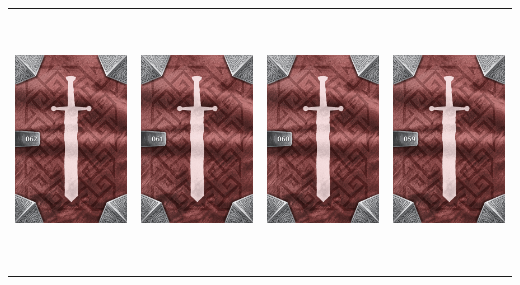 \documentclass{minimal}
\begin{document}
{\begin{longtable}{llll}
\includegraphics[width=44mm,height=68mm]{./57-63/gh-062-doom-powder-back.png} &
\includegraphics[width=44mm,height=68mm]{./57-63/gh-061-wall-shield-back.png} &
\includegraphics[width=44mm,height=68mm]{./57-63/gh-060-unstable-explosives-back.png} &
\includegraphics[width=44mm,height=68mm]{./57-63/gh-059-telescopic-lens-back.png}\\ 

\end{longtable}}
\end{document}
